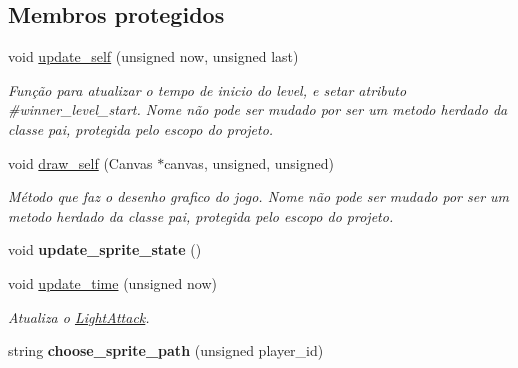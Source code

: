 \subsection*{Membros protegidos}
\begin{DoxyCompactItemize}
\item 
void \mbox{\hyperlink{classLightAttack_a3574ab1f98d5001cfa46bdde3b34a4d6}{update\+\_\+self}} (unsigned now, unsigned last)
\begin{DoxyCompactList}\small\item\em Função para atualizar o tempo de inicio do level, e setar atributo \#winner\+\_\+level\+\_\+start. Nome não pode ser mudado por ser um metodo herdado da classe pai, protegida pelo escopo do projeto. \end{DoxyCompactList}\item 
void \mbox{\hyperlink{classLightAttack_ab91f0b6fe09b6e3c89173b1942caadf1}{draw\+\_\+self}} (Canvas $\ast$canvas, unsigned, unsigned)
\begin{DoxyCompactList}\small\item\em Método que faz o desenho grafico do jogo. Nome não pode ser mudado por ser um metodo herdado da classe pai, protegida pelo escopo do projeto. \end{DoxyCompactList}\item 
\mbox{\label{classLightAttack_a209139a002383f89fcb94408451a7575}} 
void {\bfseries update\+\_\+sprite\+\_\+state} ()
\item 
\mbox{\label{classLightAttack_acbbca38c7adf864763e680ece5e890f9}} 
void \mbox{\hyperlink{classLightAttack_acbbca38c7adf864763e680ece5e890f9}{update\+\_\+time}} (unsigned now)
\begin{DoxyCompactList}\small\item\em Atualiza o \mbox{\hyperlink{classLightAttack}{Light\+Attack}}. \end{DoxyCompactList}\item 
\mbox{\label{classLightAttack_ab04457a8d15b61197f90dca426fa1f55}} 
string {\bfseries choose\+\_\+sprite\+\_\+path} (unsigned player\+\_\+id)
\end{DoxyCompactItemize}
